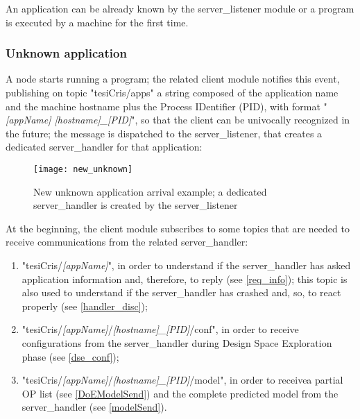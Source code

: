 An application can be already known by the server\_listener module or a program is executed by a machine for the first time.

\subsubsection{Unknown application}

A node starts running a program; the related client module notifies this event, publishing on topic "tesiCris/apps" a string composed of the application name and the machine hostname plus the Process IDentifier (PID), with format "\textit{[appName] [hostname]\_[PID]}", so that the client can be univocally recognized in the future; the message is dispatched to the server\_listener, that creates a dedicated server\_handler for that application:

\begin{figure}[H]

    \centering
    \texttt{[image: new\_unknown]}
    \caption{New unknown application arrival example; a dedicated ser\-ver\_handler is created by the server\_listener}
    
\end{figure}

At the beginning, the client module subscribes to some topics that are needed to receive communications from the related server\_handler:

\begin{enumerate}

    \item "tesiCris/\textit{[appName]}", in order to understand if the server\_handler has asked application information and, therefore, to reply (see \ref{req_info}); this topic is also used to understand if the server\_handler has crashed and, so, to react properly (see \ref{handler_disc});
    
    \item "tesiCris/\textit{[appName]}/\textit{[hostname]\_[PID]}/conf", in order to receive configurations from the server\_handler during Design Space Exploration phase (see \ref{dse_conf});
    
    \item "tesiCris/\textit{[appName]}/\textit{[hostname]\_[PID]}/model", in order to receive\linebreak a partial OP list (see \ref{DoEModelSend}) and the complete predicted model from the server\_handler (see \ref{modelSend}).

\end{enumerate}

